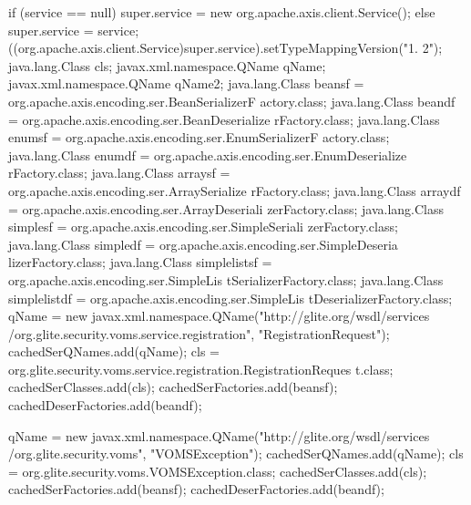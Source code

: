 \begin{DoxyCode}
                                                                                 
                                {
        if (service == null) {
            super.service = new org.apache.axis.client.Service();
        } else {
            super.service = service;
        }
        ((org.apache.axis.client.Service)super.service).setTypeMappingVersion("1.
      2");
            java.lang.Class cls;
            javax.xml.namespace.QName qName;
            javax.xml.namespace.QName qName2;
            java.lang.Class beansf = org.apache.axis.encoding.ser.BeanSerializerF
      actory.class;
            java.lang.Class beandf = org.apache.axis.encoding.ser.BeanDeserialize
      rFactory.class;
            java.lang.Class enumsf = org.apache.axis.encoding.ser.EnumSerializerF
      actory.class;
            java.lang.Class enumdf = org.apache.axis.encoding.ser.EnumDeserialize
      rFactory.class;
            java.lang.Class arraysf = org.apache.axis.encoding.ser.ArraySerialize
      rFactory.class;
            java.lang.Class arraydf = org.apache.axis.encoding.ser.ArrayDeseriali
      zerFactory.class;
            java.lang.Class simplesf = org.apache.axis.encoding.ser.SimpleSeriali
      zerFactory.class;
            java.lang.Class simpledf = org.apache.axis.encoding.ser.SimpleDeseria
      lizerFactory.class;
            java.lang.Class simplelistsf = org.apache.axis.encoding.ser.SimpleLis
      tSerializerFactory.class;
            java.lang.Class simplelistdf = org.apache.axis.encoding.ser.SimpleLis
      tDeserializerFactory.class;
            qName = new javax.xml.namespace.QName("http://glite.org/wsdl/services
      /org.glite.security.voms.service.registration", "RegistrationRequest");
            cachedSerQNames.add(qName);
            cls = org.glite.security.voms.service.registration.RegistrationReques
      t.class;
            cachedSerClasses.add(cls);
            cachedSerFactories.add(beansf);
            cachedDeserFactories.add(beandf);

            qName = new javax.xml.namespace.QName("http://glite.org/wsdl/services
      /org.glite.security.voms", "VOMSException");
            cachedSerQNames.add(qName);
            cls = org.glite.security.voms.VOMSException.class;
            cachedSerClasses.add(cls);
            cachedSerFactories.add(beansf);
            cachedDeserFactories.add(beandf);

    }
\end{DoxyCode}


